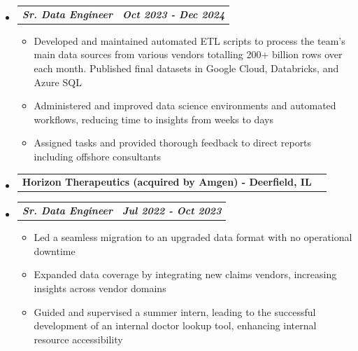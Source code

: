 \documentclass[letterpaper,11pt]{article}
\makeatletter
\newcommand{\resumeItem}[1]{
  \item\small{
    {#1 \vspace{0pt}}
  }
}
\newcommand{\resumeSubheading}[2]{
  \vspace{-1pt}\item
    \begin{tabular*}{0.97\textwidth}[t]{l@{\extracolsep{\fill}}r}
      \textbf{\small#1 - \small#2} 
    \end{tabular*}\vspace{-13pt}
}
\newcommand{\resumeSubSubheading}[2]{
    \item
    \vspace{2pt}
    \begin{tabular*}{0.97\textwidth}{l@{\extracolsep{\fill}}r}
      \textbf{\textit{\small#1}} & \textbf{\textit{\small#2}} \\
    \end{tabular*}\vspace{-5pt}
}
\newcommand{\resumeHeadingListStart}{\begin{itemize}[leftmargin=0.05in, label={}]}
\newcommand{\resumeHeadingListEnd}{\end{itemize}}
\newcommand{\resumeSubHeadingListStart}{\begin{itemize}[leftmargin=0.15in, label={}]}
\newcommand{\resumeSubHeadingListEnd}{\end{itemize}\vspace{-15pt}}
\newcommand{\resumeItemListStart}{\begin{itemize}[leftmargin=0.15in]}
\newcommand{\resumeItemListEnd}{\end{itemize}\vspace{-10pt}}
\makeatother
\begin{document}
        \resumeSubHeadingListStart
            \resumeSubSubheading {Sr. Data Engineer}{Oct 2023 - Dec 2024}
            \resumeItemListStart
                \resumeItem{Developed and maintained automated ETL scripts to process the team's
                            main data sources from various vendors totalling 200+ billion rows over each month. Published 
                            final datasets in Google Cloud, Databricks, and Azure SQL}
                \resumeItem{Administered and improved data science environments and automated workflows, reducing time to insights from weeks to days}
                \resumeItem{Assigned tasks and provided thorough feedback to direct reports including offshore consultants }
            \resumeItemListEnd
        \resumeSubHeadingListEnd
    \resumeHeadingListStart
        \resumeSubheading{Horizon Therapeutics (acquired by Amgen)}{Deerfield, IL}
    \resumeHeadingListEnd
        \resumeSubHeadingListStart
            \resumeSubSubheading {Sr. Data Engineer}{Jul 2022 - Oct 2023}
            \resumeItemListStart
                \resumeItem{Led a seamless migration to an upgraded data format with no operational downtime}
                \resumeItem{Expanded data coverage by integrating new claims vendors, increasing insights across vendor domains}
                \resumeItem{Guided and supervised a summer intern, leading to the successful development of an internal doctor lookup tool, enhancing internal resource accessibility}
            \resumeItemListEnd
        \resumeSubHeadingListEnd
\end{document}
